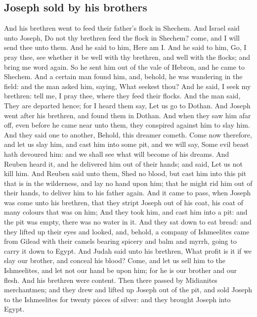 \begin{biblechapter}
\section*{Joseph sold by his brothers}
\verse And his brethren went to feed their father's flock in Shechem.
\verse And Israel said unto Joseph, Do not thy brethren feed the flock in Shechem? come, and I will send thee unto them. And he said to him, Here am I.
\verse And he said to him, Go, I pray thee, see whether it be well with thy brethren, and well with the flocks; and bring me word again. So he sent him out of the vale of Hebron, and he came to Shechem.
\verse And a certain man found him, and, behold, he was wandering in the field: and the man asked him, saying, What seekest thou?
\verse And he said, I seek my brethren: tell me, I pray thee, where they feed their flocks.
\verse And the man said, They are departed hence; for I heard them say, Let us go to Dothan. And Joseph went after his brethren, and found them in Dothan.
\verse And when they saw him afar off, even before he came near unto them, they conspired against him to slay him.
\verse And they said one to another, Behold, this dreamer cometh.
\verse Come now therefore, and let us slay him, and cast him into some pit, and we will say, Some evil beast hath devoured him: and we shall see what will become of his dreams.
\verse And Reuben heard it, and he delivered him out of their hands; and said, Let us not kill him.
\verse And Reuben said unto them, Shed no blood, but cast him into this pit that is in the wilderness, and lay no hand upon him; that he might rid him out of their hands, to deliver him to his father again.
\verse And it came to pass, when Joseph was come unto his brethren, that they stript Joseph out of his coat, his coat of many colours that was on him;
\verse And they took him, and cast him into a pit: and the pit was empty, there was no water in it.
\verse And they sat down to eat bread: and they lifted up their eyes and looked, and, behold, a company of Ishmeelites came from Gilead with their camels bearing spicery and balm and myrrh, going to carry it down to Egypt.
\verse And Judah said unto his brethren, What profit is it if we slay our brother, and conceal his blood?
\verse Come, and let us sell him to the Ishmeelites, and let not our hand be upon him; for he is our brother and our flesh. And his brethren were content.
\verse Then there passed by Midianites merchantmen; and they drew and lifted up Joseph out of the pit, and sold Joseph to the Ishmeelites for twenty pieces of silver: and they brought Joseph into Egypt.

\end{biblechapter}
